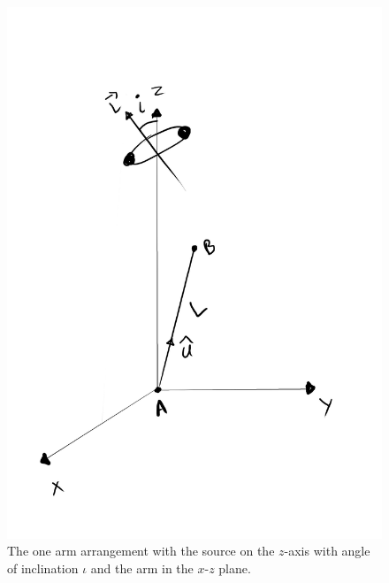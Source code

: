 \documentclass[10pt,a4paper]{article}
\begin{document}
\begin{figure}[h]
\centering
\includegraphics[scale=0.25]{../Figures/diagram1.jpg}
\caption{The one arm arrangement with the source on the $z$-axis with
  angle of inclination $\iota$ and the arm in the $x$-$z$
  plane.\label{fig:binary}}
\end{figure}
\end{document}
